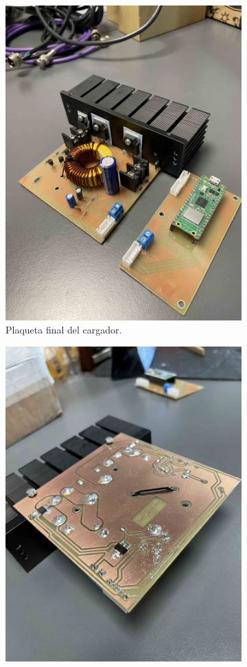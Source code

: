 \begin{figure}[H]
    \begin{subfigure}{0.5\textwidth}
        \includegraphics[width=0.9\linewidth]{MPPT/IMG_8864.jpg} 
        \caption{Plaqueta final del cargador.}
        \label{fig:subim1}
    \end{subfigure}
    \begin{subfigure}{0.5\textwidth}
        \includegraphics[width=0.9\linewidth]{MPPT/IMG_8866.jpg}

\end{subfigure}
\end{figure}
